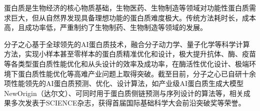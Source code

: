 
蛋白质是生物经济的核心物质基础，生物医药、生物制造等领域对功能性蛋白质需求巨大，但从自然界发现具备理想功能的蛋白质难度极大。传统方法耗时长，成本高，且成功率低，严重制约了生物制药、生物制造等领域的发展。\par
分子之心基于全球领先的AI蛋白质技术，融合分子动力学、量子化学等科学计算方法，实现小样本甚至零样本的蛋白质精准优化和设计，极大提升抗体、酶、疫苗等各类型蛋白质性能优化和从头设计的效率及成功率，在酶活性优化设计、极端环境下蛋白质性能优化等高难产业问题上取得突破。截至目前，分子之心已自研十余项性能领先的AI蛋白质预测、优化、设计算法，如产业级AI蛋白质生成大模型NewOrigin（达尔文）、可同时用于蛋白质侧链预测与序列设计的算法等，相关成果多次发表于SCIENCE杂志，获得首届国际基础科学大会前沿突破奖等荣誉。
